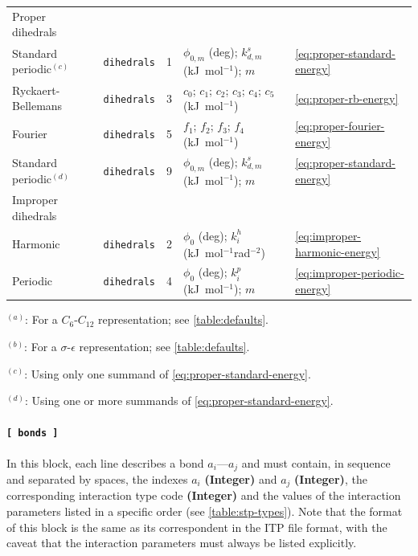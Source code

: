 \documentclass[10pt,a4paper]{report}
\numberwithin{equation}{section}
\begin{document}
\begin{table}[tb]
\begin{tabular}{lccp{49ex}l}
Proper dihedrals &  &  &  & \\
\hspace{1ex} Standard periodic$^{(c)}$  & \texttt{dihedrals} &  1 & \(\phi_{0,m}\) (deg); \(k_{d,m}^s\) (kJ~mol$^{-1}$); \(m\) & \autoref{eq:proper-standard-energy}\\
\hspace{1ex} Ryckaert-Bellemans & \texttt{dihedrals} &  3 & \(c_0\); \(c_1\); \(c_2\); \(c_3\); \(c_4\); \(c_5\) (kJ~mol$^{-1}$)& \autoref{eq:proper-rb-energy}\\
\hspace{1ex} Fourier & \texttt{dihedrals} &  5 & \(f_1\); \(f_2\); \(f_3\); \(f_4\) (kJ~mol$^{-1}$) & \autoref{eq:proper-fourier-energy}\\
\hspace{1ex} Standard periodic$^{(d)}$  & \texttt{dihedrals} &  9 & \(\phi_{0,m}\) (deg); \(k_{d,m}^s\) (kJ~mol$^{-1}$); \(m\) & \autoref{eq:proper-standard-energy}\\
\hline
Improper dihedrals & &  &  & \\
\hspace{1ex} Harmonic & \texttt{dihedrals} &  2 & \(\phi_{0}\) (deg); \(k_i^h\) (kJ~mol$^{-1}$rad$^{-2}$)& \autoref{eq:improper-harmonic-energy}\\
\hspace{1ex} Periodic & \texttt{dihedrals} &  4 & \(\phi_{0}\) (deg); \(k_{i}^p\) (kJ~mol$^{-1}$); \(m\) & \autoref{eq:improper-periodic-energy}\\
\bottomrule
  \end{tabular}
  \vspace{1ex}\par
  {\footnotesize $^{(a)}$: For a $C_6$-$C_{12}$ representation; see \autoref{table:defaults}. \par $^{(b)}$: For a $\sigma$-$\epsilon$ representation; see \autoref{table:defaults}. \par $^{(c)}$: Using only one summand of \autoref{eq:proper-standard-energy}. \par $^{(d)}$: Using one or more summands of \autoref{eq:proper-standard-energy}.}
\end{table}

\paragraph{\texttt{[~bonds~]}}

In this block, each line describes a bond $a_i$---$a_j$ and must
contain, in sequence and separated by spaces, the indexes $a_i$
\textbf{(Integer)} and $a_j$ \textbf{(Integer)}, the corresponding
interaction type code \textbf{(Integer)} and the values of the
interaction parameters listed in a specific order (see
\autoref{table:stp-types}). Note that the format of this block is the
same as its correspondent in the ITP file format, with the caveat that
the interaction parameters must always be listed explicitly.
\end{document}
